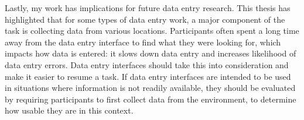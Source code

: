 Lastly, my work has implications for future data entry research. This thesis has highlighted that for some types of data entry work, a major component of the task is collecting data from various locations. Participants often spent a long time away from the data entry interface to find what they were looking for, which impacts how data is entered: it slows down data entry and increases likelihood of data entry errors. Data entry interfaces should take this into consideration and make it easier to resume a task. If data entry interfaces are intended to be used in situations where information is not readily available, they should be evaluated by requiring participants to first collect data from the environment, to determine how usable they are in this context. 




